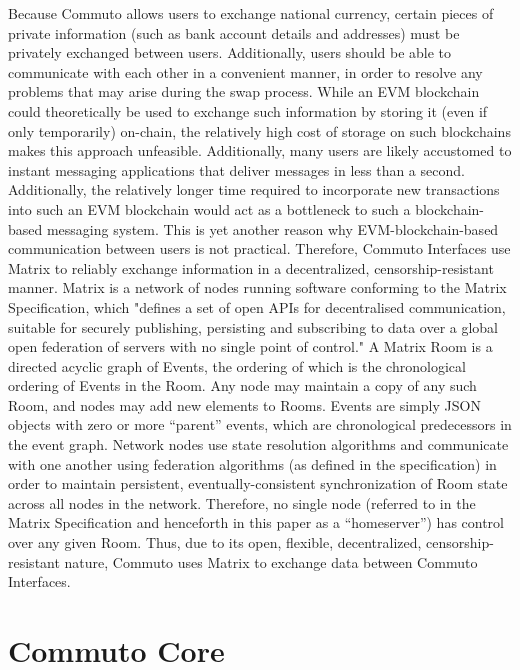 \documentclass[11pt]{article}
\begin{document}
    Because Commuto allows users to exchange national currency, certain pieces of private
    information (such as bank account details and addresses) must be privately exchanged between
    users.
    Additionally, users should be able to communicate with each other in a convenient manner, in
    order to resolve any problems that may arise during the swap process.
    While an EVM blockchain could theoretically be used to exchange such information by storing it
    (even if only temporarily) on-chain, the relatively high cost of storage on such blockchains
    makes this approach unfeasible.
    Additionally, many users are likely accustomed to instant messaging applications that
    deliver messages in less than a second.
    Additionally, the relatively longer time required to incorporate new transactions into such an
    EVM blockchain would act as a bottleneck to such a blockchain-based messaging system.
    This is yet another reason why EVM-blockchain-based communication between users is not
    practical.
    Therefore, Commuto Interfaces use Matrix\cite{Matrix} to reliably exchange information in a
    decentralized, censorship-resistant manner.
    Matrix is a network of nodes running software conforming to the Matrix
    Specification\cite{MatrixSpec}, which "defines a set of open APIs for decentralised
    communication, suitable for securely publishing, persisting and subscribing to data over a
    global open federation of servers with no single point of control."
    A Matrix Room is a directed acyclic graph of Events, the ordering of which is the chronological
    ordering of Events in the Room.
    Any node may maintain a copy of any such Room, and nodes may add new elements to Rooms.
    Events are simply JSON objects with zero or more ``parent'' events, which are chronological
    predecessors in the event graph.
    Network nodes use state resolution algorithms and communicate with one another using federation
    algorithms (as defined in the specification) in order to maintain persistent,
    eventually-consistent synchronization of Room state across all nodes in the network.
    Therefore, no single node (referred to in the Matrix Specification and henceforth in this paper
    as a ``homeserver'') has control over any given Room.
    Thus, due to its open, flexible, decentralized, censorship-resistant nature, Commuto uses Matrix
    to exchange data between Commuto Interfaces.

    \section*{Commuto Core}
\end{document}
